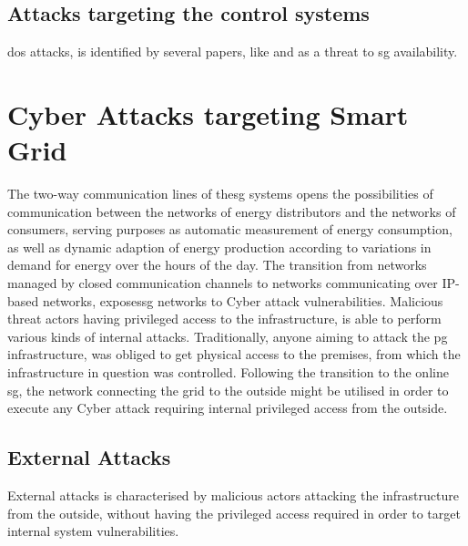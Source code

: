 \subsection{Attacks targeting the control systems}


\acrfull{dos} attacks, is identified by several papers, like  \cite{sundararajan2019survey} and \cite{gupta2017survey} as  a threat to \acrshort{sg} availability. 








\section{Cyber Attacks targeting Smart Grid}

The two-way communication lines of the\acrlong{sg} systems opens the possibilities of communication between the networks of energy distributors and the networks of consumers, serving purposes as automatic measurement of energy consumption, as well as dynamic adaption of energy production according to variations in demand for energy over the hours of the day.
The transition from networks managed by closed communication channels to networks communicating over IP-based networks, exposes\acrlong{sg} networks to Cyber attack vulnerabilities.
Malicious threat actors having privileged access to the infrastructure, is able to perform various kinds of internal attacks. Traditionally, anyone aiming to attack the \acrlong{pg} infrastructure, was obliged to get physical access to the premises, from which the infrastructure in question was controlled. Following the transition to the online \acrshort{sg}, the network connecting the grid to the outside might be utilised in order to execute any Cyber attack requiring internal privileged access from the outside.


\subsection{External Attacks}
External attacks is characterised by malicious actors attacking the infrastructure from the outside, without having the privileged access required in order to target internal system vulnerabilities.


